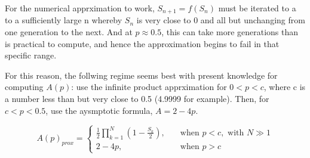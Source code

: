 \documentclass[11pt]{article}
\begin{document}
For the numerical apprximation to work, $S_{n+1} = f(S_n)$ must be iterated to a to a sufficiently large n whereby $S_n$ is very close to 0 and all but unchanging from one generation to the next. 
And at $p\approx 0.5$, this can take more generations than is practical to compute, and hence the approximation begins to fail in that specific range.

For this reason, the follwing regime seems best with present knowledge for computing $A(p)$:
use the infinite product apprximation for $0<p<c$, where c is a number less than but very close to 0.5 (4.9999 for example). Then, 
for $c<p<0.5$, use the aysmptotic formula, $A=2-4p$.

\begin{equation*}
    A(p)_{prox} =
\begin{cases}
\frac{1}{2}\prod_{k=1}^N \left(1 - \frac{S_k}{2}\right),\quad &\text{when }p<c,\text{ with }N\gg1\\
2-4p, \quad&\text{when }p>c
\end{cases}
\end{equation*}
\end{document}
